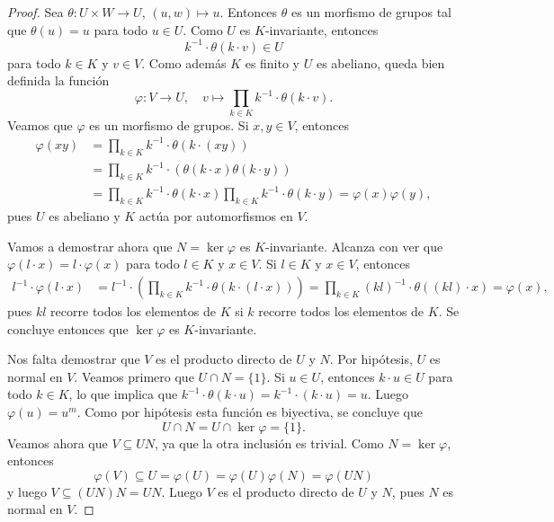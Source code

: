 \begin{proof}
Sea $\theta\colon U\times W\to U$, $(u,w)\mapsto u$. Entonces $\theta$ es un morfismo de grupos tal que 
$\theta(u)=u$ para todo $u\in U$. Como $U$ es $K$-invariante, entonces
\[
k^{-1}\cdot \theta(k\cdot v)\in U
\]
para todo $k\in K$ y $v\in V$. 
Como además $K$ es finito y $U$ es abeliano, 
queda bien definida la función
\[
\varphi\colon V\to U,\quad 
v\mapsto \prod_{k\in K}k^{-1}\cdot \theta(k\cdot v).
\]
Veamos que $\varphi$ es un morfismo de grupos. Si $x,y\in V$, entonces
\begin{align*}
    \varphi(xy) &= \prod_{k\in K}k^{-1}\cdot \theta(k\cdot (xy))\\
    &= \prod_{k\in K}k^{-1}\cdot (\theta(k\cdot x)\theta(k\cdot y))\\
    &= \prod_{k\in K}k^{-1}\cdot \theta(k\cdot x) \prod_{k\in K}k^{-1}\cdot \theta(k\cdot y)=\varphi(x)\varphi(y),
\end{align*}
pues $U$ es abeliano y $K$ actúa por automorfismos en $V$. 

Vamos a demostrar ahora que $N=\ker\varphi$ es $K$-invariante. 
Alcanza con ver que $\varphi(l\cdot x)=l\cdot\varphi(x)$ para todo $l\in K$ y $x\in V$. 
Si $l\in K$ y $x\in V$, entonces
\begin{align*}
l^{-1}\cdot\varphi(l\cdot x)&=l^{-1}\cdot\left(\prod_{k\in K}k^{-1}\cdot \theta(k\cdot (l\cdot x))\right)=\prod_{k\in K}(kl)^{-1}\cdot\theta( (kl)\cdot x)=\varphi(x),
\end{align*}
pues $kl$ recorre todos los elementos de $K$ si $k$ recorre todos los elementos de $K$.
Se concluye entonces que $\ker\varphi$ es $K$-invariante. 

Nos falta demostrar que $V$ es el producto directo de $U$ y $N$. Por hipótesis, $U$ es normal en $V$. 
Veamos primero que $U\cap N=\{1\}$. Si $u\in U$, entonces $k\cdot u\in U$ para todo $k\in K$, lo 
que implica que $k^{-1}\cdot\theta(k\cdot u)=k^{-1}\cdot (k\cdot u)=u$. Luego $\varphi(u)=u^m$. Como por hipótesis 
esta función es biyectiva, se concluye que 
\[
U\cap N=U\cap\ker\varphi=\{1\}.
\]
Veamos ahora que $V\subseteq UN$, ya que
la otra inclusión es trivial. Como $N=\ker\varphi$, entonces 
\[
\varphi(V)\subseteq U=\varphi(U)=\varphi(U)\varphi(N)=\varphi(UN) 
\]
y luego $V\subseteq (UN)N=UN$. 
Luego $V$ es el producto directo de $U$ y $N$, pues $N$ es normal en $V$.
\end{proof}

